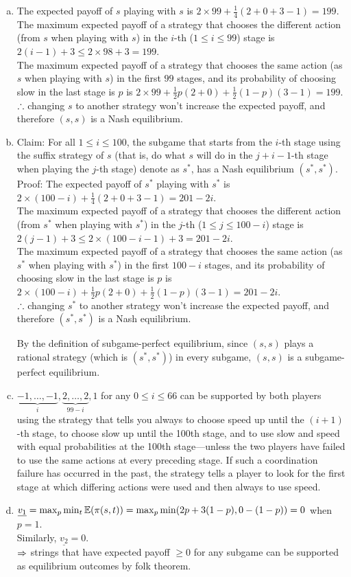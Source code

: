 \begin{pr}[11.9.28]$ $
\begin{enumerate}[(a)]
\item The expected payoff of $s$ playing with $s$ is $2\times99+\frac14(2+0+3-1)=199$.\\
The maximum expected payoff of a strategy that chooses the different action (from $s$ when playing with $s$) in the $i$-th ($1\leq i\leq99$) stage is $2(i-1)+3\leq2\times98+3=199$.\\
The maximum expected payoff of a strategy that chooses the same action (as $s$ when playing with $s$) in the first $99$ stages, and its probability of choosing slow in the last stage is $p$ is $2\times99+\frac12p(2+0)+\frac12(1-p)(3-1)=199$.\\
$\therefore$ changing $s$ to another strategy won't increase the expected payoff, and therefore $(s, s)$ is a Nash equilibrium.
\item Claim: For all $1\leq i\leq100$, the subgame that starts from the $i$-th stage using the suffix strategy of $s$ (that is, do what $s$ will do in the $j+i-1$-th stage when playing the $j$-th stage) denote as $s^*$, has a Nash equilibrium $(s^*, s^*)$.\\
Proof: The expected payoff of $s^*$ playing with $s^*$ is $2\times(100-i)+\frac14(2+0+3-1)=201-2i$.\\
The maximum expected payoff of a strategy that chooses the different action (from $s^*$ when playing with $s^*$) in the $j$-th ($1\leq j\leq100-i$) stage is $2(j-1)+3\leq2\times(100-i-1)+3=201-2i$.\\
The maximum expected payoff of a strategy that chooses the same action (as $s^*$ when playing with $s^*$) in the first $100-i$ stages, and its probability of choosing slow in the last stage is $p$ is $2\times(100-i)+\frac12p(2+0)+\frac12(1-p)(3-1)=201-2i$.\\
$\therefore$ changing $s^*$ to another strategy won't increase the expected payoff, and therefore $(s^*, s^*)$ is a Nash equilibrium.

By the definition of subgame-perfect equilibrium, since $(s, s)$ plays a rational strategy (which is $(s^*, s^*)$) in every subgame, $(s, s)$ is a subgame-perfect equilibrium.
\item $\underbrace{-1, \dots, -1}_i, \underbrace{2, \dots, 2}_{99-i}, 1$ for any $0\leq i\leq66$ can be supported by both players using the strategy that tells you always to choose speed up until the $(i+1)$-th stage, to choose slow up until the 100th stage, and to use slow and speed with equal probabilities at the 100th stage—unless the two players have failed to use the same actions at every preceding stage. If such a coordination failure has occurred in the past, the strategy tells a player to look for the ﬁrst stage at which differing actions were used and then always to use speed.
\item $\underline{v_1}=\max_p\min_t\mathbb{E}(\pi(s, t))=\max_p\min(2p+3(1-p), 0-(1-p))=0$ when $p=1$.\\
Similarly, $\underline{v_2}=0$.\\
$\Rightarrow$ strings that have expected payoff $\geq0$ for any subgame can be supported as equilibrium outcomes by folk theorem.
\end{enumerate}
\end{pr}
